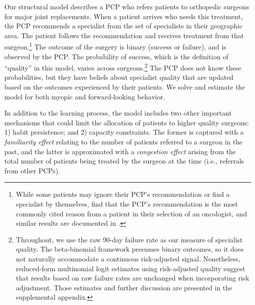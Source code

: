 \documentclass[12pt]{article}
\begin{document}
Our structural model describes a PCP who refers patients to orthopedic surgeons for major joint replacements. When a patient arrives who needs this treatment, the PCP recommends a specialist from the set of specialists in their geographic area. The patient follows the recommendation and receives treatment from that surgeon.\footnote{While some patients may ignore their PCP's recommendation or find a specialist by themselves, \cite{freedman2015} find that the PCP's recommendation is the most commonly cited reason from a patient in their selection of an oncologist, and similar results are documented in \cite{barkowski2018}.}
The outcome of the surgery is binary (success or failure), and is observed by the PCP.  The probability of success, which is the definition of ``quality'' in this model,  varies across surgeons.\footnote{Throughout, we use the raw 90-day failure rate as our measure of specialist quality. The beta-binomial framework presumes binary outcomes, so it does not naturally accommodate a continuous risk-adjusted signal. Nonetheless, reduced-form multinomial logit estimates using risk-adjusted quality suggest that results based on raw failure rates are unchanged when incorporating risk adjustment. Those estimates and further discussion are presented in the supplemental appendix.} The PCP does not know these probabilities, but they have beliefs about specialist quality that are updated based on the outcomes experienced by their patients. We solve and estimate the model for both myopic and forward-looking behavior. 

In addition to the learning process, the model includes two other important mechanisms that could limit the allocation of patients to higher quality surgeons: 1) habit persistence; and 2) capacity constraints. The former is captured with a \emph{familiarity effect} relating to the number of patients referred to a surgeon in the past, and the latter is approximated with a \emph{congestion effect} arising from the total number of patients being treated by the surgeon at the time (i.e., referrals from other PCPs).  
\end{document}

